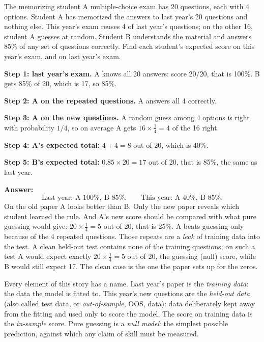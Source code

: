 \begin{sample}{The memorizing student}
A multiple-choice exam has 20 questions, each with 4 options. Student A has memorized the answers to last year's 20 questions and nothing else. This year's exam reuses 4 of last year's questions; on the other 16, student A guesses at random. Student B understands the material and answers 85\% of any set of questions correctly. Find each student's expected score on this year's exam, and on last year's exam.

\textbf{Step 1: last year's exam.} A knows all 20 answers: score 20/20, that is 100\%. B gets 85\% of 20, which is 17, so 85\%.

\textbf{Step 2: A on the repeated questions.} A answers all 4 correctly.

\textbf{Step 3: A on the new questions.} A random guess among 4 options is right with probability $1/4$, so on average A gets $16 \times \tfrac14 = 4$ of the 16 right.

\textbf{Step 4: A's expected total:} $4 + 4 = 8$ out of 20, which is 40\%.

\textbf{Step 5: B's expected total:} $0.85 \times 20 = 17$ out of 20, that is 85\%, the same as last year.

\textbf{Answer:}
\[
\boxed{\text{Last year: A } 100\%,\ \text{B } 85\%.\qquad \text{This year: A } 40\%,\ \text{B } 85\%.}
\]
On the old paper A looks better than B. Only the new paper reveals which student learned the rule. And A's new score should be compared with what pure guessing would give: $20 \times \tfrac14 = 5$ out of 20, that is 25\%. A beats guessing only because of the 4 repeated questions. Those repeats are a \emph{leak} of training data into the test. A clean held-out test contains none of the training questions; on such a test A would expect exactly $20\times\tfrac14 = 5$ out of 20, the guessing (null) score, while B would still expect 17. The clean case is the one the paper sets up for the zeros.
\end{sample}

Every element of this story has a name. Last year's paper is the \emph{training data}: the data the model is fitted to. This year's new questions are the \emph{held-out data} (also called test data, or \emph{out-of-sample}, OOS, data): data deliberately kept away from the fitting and used only to score the model. The score on training data is the \emph{in-sample} score. Pure guessing is a \emph{null model}: the simplest possible prediction, against which any claim of skill must be measured.

